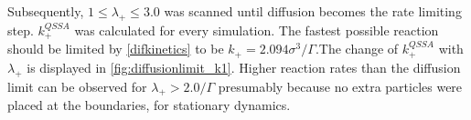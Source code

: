 \documentclass[
  a4paper,BCOR10mm,twoside,
  headsepline,footsepline,%
  fleqn,openbib
]{scrbook}
\begin{document}
Subsequently,  $1\leq\lambda_+\leq3.0$ was scanned until diffusion becomes the rate limiting step. $k^{QSSA}_{+}$ was calculated for every simulation. The fastest possible reaction should be limited by \cref{difkinetics} to be $k_+=2.094 \sigma^3/\Gamma$.The change of $k^{QSSA}_{+}$ with $\lambda_+$ is displayed in \cref{fig:diffusionlimit_k1}. Higher reaction rates than the diffusion limit can be observed for $\lambda_+>2.0 /\Gamma$ presumably because no extra particles were placed at the boundaries, for stationary dynamics. 

 \newpage
\end{document}
